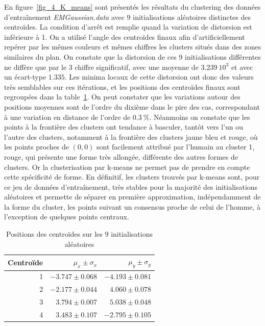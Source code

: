 \documentclass[12pt,a4paper,onecolumn]{article}
\begin{document}
En figure~\ref{fig_4_K_means} sont présentés les résultats du clustering des données d'entraînement \textit{EMGaussian.data} avec 9 initialisations aléatoires distinctes des centroïdes. La condition d'arrêt est remplie quand la variation de distorsion est inférieure à 1. On a utilisé l'angle des centroïdes finaux afin d'artificiellement repérer par les mêmes couleurs et mêmes chiffres les clusters situés dans des zones similaires du plan. On constate que la distorsion de ces 9 initialisations différentes ne diffère que par le 3 chiffre significatif, avec une moyenne de \(3.239~10^{3}\) et avec un écart-type \(1.335\). Les minima locaux de cette distorsion ont donc des valeurs très semblables sur ces itérations, et les positions des centroïdes finaux sont regroupées dans la table~\ref{tab_4_a}. On peut constater que les variations autour des positions moyennes sont de l'ordre du dixième dans le pire des cas, correspondant à une variation en distance de l'ordre de \(0.3~\%\). Néanmoins on constate que les points à la frontière des clusters ont tendance à basculer, tantôt vers l'un ou l'autre des clusters, notamment à la frontière des clusters jaune bleu et rouge, où les points proches de \((0,0)\) sont facilement attribué par l'humain au cluster 1, rouge, qui présente une forme très allongée, différente des autres formes de clusters. Or la clusterisation par k-means ne permet pas de prendre en compte cette spécificité de forme. En définitif, les clusters trouvés par k-means sont, pour ce jeu de données d'entraînement, très stables pour la majorité des initialisations aléatoires et permette de séparer en première approximation, indépendamment de la forme du cluster, les points suivant un consensus proche de celui de l'homme, à l'exception de quelques points centraux.

\begin{table}
	\centering
	\begin{tabular}{r|r|r}
		\hline
		Centroïde & \(\mu_x \pm \sigma_x\) & \(\mu_y \pm \sigma_y\) \\\hline
		1         & \(-3.747\pm 0.068\)    & \(-4.193\pm 0.081\)    \\\hline
		2         & \( -2.177 \pm 0.044\)  & \( 4.060\pm 0.078 \)   \\\hline
		3         & \( 3.794\pm 0.007\)    & \( 5.038\pm 0.048\)    \\\hline
		4         & \( 3.483\pm 0.107\)    & \( -2.795\pm 0.105 \)  \\\hline
	\end{tabular}
	\caption{Positions des centroïdes sur les 9 initialisations aléatoires}
	\label{tab_4_a}
\end{table}
\end{document}
